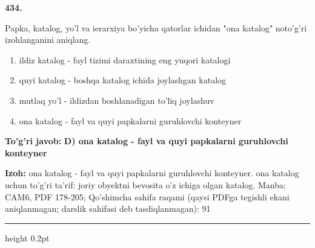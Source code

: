 \documentclass[10pt,a4paper]{article}
\begin{document}
{\bfseries\sffamily\color{ink} 434.}
\par
Papka, katalog, yo'l va ierarxiya bo'yicha qatorlar ichidan "ona katalog" noto'g'ri izohlanganini aniqlang.
\begin{enumerate}[label=\Alph*),leftmargin=9mm]
\item ildiz katalog - fayl tizimi daraxtining eng yuqori katalogi
\item quyi katalog - boshqa katalog ichida joylashgan katalog
\item mutlaq yo'l - ildizdan boshlanadigan to'liq joylashuv
\item ona katalog - fayl va quyi papkalarni guruhlovchi konteyner
\end{enumerate}
\begin{tcolorbox}[enhanced,breakable,colback=teal!4,colframe=teal!60!black,boxrule=0.45pt,arc=1.2mm,left=2.7mm,right=2.7mm,top=1.8mm,bottom=1.8mm,before skip=2mm,after skip=2mm]
{\bfseries\sffamily\color{teal}To'g'ri javob:} \textbf{D) ona katalog - fayl va quyi papkalarni guruhlovchi konteyner}
\par\smallskip
{\bfseries Izoh:} ona katalog - fayl va quyi papkalarni guruhlovchi konteyner. ona katalog uchun to'g'ri ta'rif: joriy obyektni bevosita o'z ichiga olgan katalog. Manba: CAM6, PDF 178-205; Qo'shimcha sahifa raqami (qaysi PDFga tegishli ekani aniqlanmagan; darslik sahifasi deb tasdiqlanmagan): 91
\end{tcolorbox}
\vspace{2mm}\hrule height 0.2pt\vspace{3mm}
\end{document}
